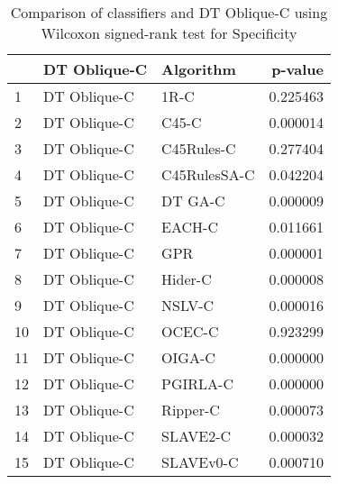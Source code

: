 \begin{table}
\footnotesize
\caption{Comparison of classifiers and DT Oblique-C using Wilcoxon signed-rank test for Specificity}
\label{tab:DT Oblique-C wilcoxon Specificity comparison}
\begin{tabular}{lllr}
\hline
 & DT Oblique-C & Algorithm & p-value \\
\hline
1 & DT Oblique-C & 1R-C & 0.225463 \\
2 & DT Oblique-C & C45-C & 0.000014 \\
3 & DT Oblique-C & C45Rules-C & 0.277404 \\
4 & DT Oblique-C & C45RulesSA-C & 0.042204 \\
5 & DT Oblique-C & DT GA-C & 0.000009 \\
6 & DT Oblique-C & EACH-C & 0.011661 \\
7 & DT Oblique-C & GPR & 0.000001 \\
8 & DT Oblique-C & Hider-C & 0.000008 \\
9 & DT Oblique-C & NSLV-C & 0.000016 \\
10 & DT Oblique-C & OCEC-C & 0.923299 \\
11 & DT Oblique-C & OIGA-C & 0.000000 \\
12 & DT Oblique-C & PGIRLA-C & 0.000000 \\
13 & DT Oblique-C & Ripper-C & 0.000073 \\
14 & DT Oblique-C & SLAVE2-C & 0.000032 \\
15 & DT Oblique-C & SLAVEv0-C & 0.000710 \\
\hline
\end{tabular}
\end{table}
